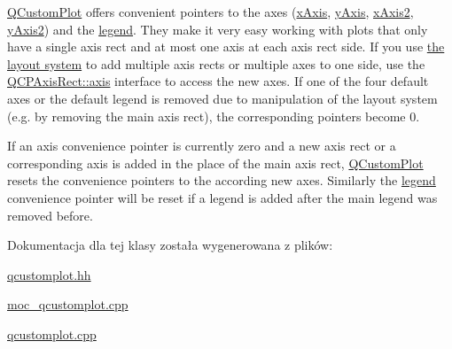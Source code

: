 \hyperlink{class_q_custom_plot}{Q\+Custom\+Plot} offers convenient pointers to the axes (\hyperlink{class_q_custom_plot_a9a79cd0158a4c7f30cbc702f0fd800e4}{x\+Axis}, \hyperlink{class_q_custom_plot_af6fea5679725b152c14facd920b19367}{y\+Axis}, \hyperlink{class_q_custom_plot_ada41599f22cad901c030f3dcbdd82fd9}{x\+Axis2}, \hyperlink{class_q_custom_plot_af13fdc5bce7d0fabd640f13ba805c0b7}{y\+Axis2}) and the \hyperlink{class_q_custom_plot_a4eadcd237dc6a09938b68b16877fa6af}{legend}. They make it very easy working with plots that only have a single axis rect and at most one axis at each axis rect side. If you use \hyperlink{}{the layout system} to add multiple axis rects or multiple axes to one side, use the \hyperlink{class_q_c_p_axis_rect_a560de44e47a4af0f86c59102a094b1e4}{Q\+C\+P\+Axis\+Rect\+::axis} interface to access the new axes. If one of the four default axes or the default legend is removed due to manipulation of the layout system (e.\+g. by removing the main axis rect), the corresponding pointers become 0.

If an axis convenience pointer is currently zero and a new axis rect or a corresponding axis is added in the place of the main axis rect, \hyperlink{class_q_custom_plot}{Q\+Custom\+Plot} resets the convenience pointers to the according new axes. Similarly the \hyperlink{class_q_custom_plot_a4eadcd237dc6a09938b68b16877fa6af}{legend} convenience pointer will be reset if a legend is added after the main legend was removed before. 

Dokumentacja dla tej klasy została wygenerowana z plików\+:\begin{DoxyCompactItemize}
\item 
\hyperlink{qcustomplot_8hh}{qcustomplot.\+hh}\item 
\hyperlink{moc__qcustomplot_8cpp}{moc\+\_\+qcustomplot.\+cpp}\item 
\hyperlink{qcustomplot_8cpp}{qcustomplot.\+cpp}\end{DoxyCompactItemize}
